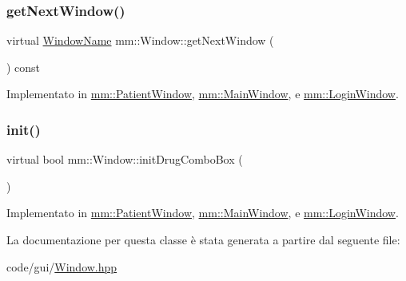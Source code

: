 \subsubsection{\texorpdfstring{get\+Next\+Window()}{getNextWindow()}}
{\footnotesize\ttfamily virtual \hyperlink{namespacemm_a4e9d92e04f65dbf2fc1963947da0d93c}{Window\+Name} mm\+::\+Window\+::get\+Next\+Window (\begin{DoxyParamCaption}{ }\end{DoxyParamCaption}) const\hspace{0.3cm}{\ttfamily [pure virtual]}}



Implementato in \hyperlink{classmm_1_1_patient_window_ae22b9bce4c7ccdbcc45feb080088a558}{mm\+::\+Patient\+Window}, \hyperlink{classmm_1_1_main_window_aa1511ad7bed8d47cd35415d0a3a1161e}{mm\+::\+Main\+Window}, e \hyperlink{classmm_1_1_login_window_a399eb7e1a310016ff83b7aa6a9d69722}{mm\+::\+Login\+Window}.

\mbox{\label{classmm_1_1_window_aba03fbf4761b2f106352baecf5996e10}} 
\subsubsection{\texorpdfstring{init()}{init()}}
{\footnotesize\ttfamily virtual bool mm\+::\+Window\+::initDrugComboBox (\begin{DoxyParamCaption}{ }\end{DoxyParamCaption})\hspace{0.3cm}{\ttfamily [pure virtual]}}



Implementato in \hyperlink{classmm_1_1_patient_window_a0ad27245769b095559858eeecdbb7089}{mm\+::\+Patient\+Window}, \hyperlink{classmm_1_1_main_window_a1094273a8ac991a50e4612efa8174fdd}{mm\+::\+Main\+Window}, e \hyperlink{classmm_1_1_login_window_a4040d7c1f85fc76e1f60ef13f92bef1c}{mm\+::\+Login\+Window}.



La documentazione per questa classe è stata generata a partire dal seguente file\+:\begin{DoxyCompactItemize}
\item 
code/gui/\hyperlink{_window_8hpp}{Window.\+hpp}\end{DoxyCompactItemize}
